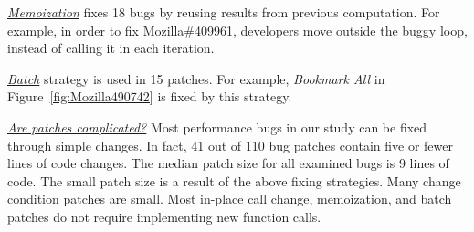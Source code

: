 \underline{\it Memoization} fixes 18 bugs by reusing results 
from previous computation. 
For example, in order to fix Mozilla\#409961, 
developers move  outside the buggy loop, instead of calling it in each iteration.  

\underline{\it Batch} strategy is used in 15 patches. 
For example, {\it Bookmark All} in Figure~\ref{fig:Mozilla490742} is fixed by this strategy.   

\underline{\it Are patches complicated?}
Most performance bugs in our study can be fixed through simple changes. 
In fact, 41 out of 110 bug patches contain five or fewer lines of code changes. 
The median patch size for all examined bugs is 9 lines of code.
The small patch size is a result of the above fixing strategies.
Many change condition patches are small. 
Most in-place call change, memoization, and batch patches do not require implementing new function calls.

